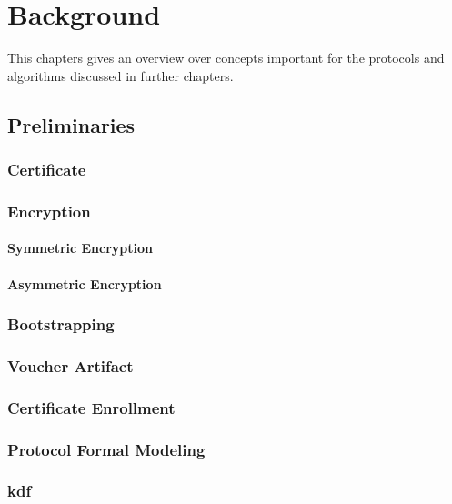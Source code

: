 \chapter{Background}
\label{ch:background}

This chapters gives an overview over concepts important for the protocols and algorithms discussed in further chapters.
\section{Preliminaries}

\subsection{Certificate}

\subsection{Encryption}
	\subsubsection{Symmetric Encryption}
	\subsubsection{Asymmetric Encryption}
	
\subsection{Bootstrapping}

\subsection{Voucher Artifact}

\subsection{Certificate Enrollment}

\subsection{Protocol Formal Modeling}

\subsection{\acrfull*{kdf}} \label{backgroung:kdf}

